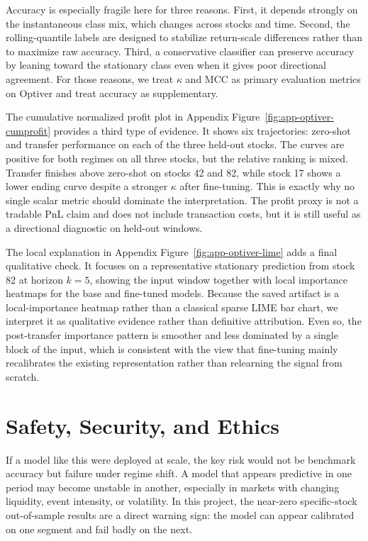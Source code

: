 \documentclass[11pt]{article}
\begin{document}
Accuracy is especially fragile here for three reasons. First, it depends strongly on the instantaneous class mix, which changes across stocks and time. Second, the rolling-quantile labels are designed to stabilize return-scale differences rather than to maximize raw accuracy. Third, a conservative classifier can preserve accuracy by leaning toward the stationary class even when it gives poor directional agreement. For those reasons, we treat $\kappa$ and MCC as primary evaluation metrics on Optiver and treat accuracy as supplementary.

The cumulative normalized profit plot in Appendix Figure~\ref{fig:app-optiver-cumprofit} provides a third type of evidence. It shows six trajectories: zero-shot and transfer performance on each of the three held-out stocks. The curves are positive for both regimes on all three stocks, but the relative ranking is mixed. Transfer finishes above zero-shot on stocks 42 and 82, while stock 17 shows a lower ending curve despite a stronger $\kappa$ after fine-tuning. This is exactly why no single scalar metric should dominate the interpretation. The profit proxy is not a tradable PnL claim and does not include transaction costs, but it is still useful as a directional diagnostic on held-out windows.

The local explanation in Appendix Figure~\ref{fig:app-optiver-lime} adds a final qualitative check. It focuses on a representative stationary prediction from stock 82 at horizon $k=5$, showing the input window together with local importance heatmaps for the base and fine-tuned models. Because the saved artifact is a local-importance heatmap rather than a classical sparse LIME bar chart, we interpret it as qualitative evidence rather than definitive attribution. Even so, the post-transfer importance pattern is smoother and less dominated by a single block of the input, which is consistent with the view that fine-tuning mainly recalibrates the existing representation rather than relearning the signal from scratch.

\section{Safety, Security, and Ethics}
If a model like this were deployed at scale, the key risk would not be benchmark accuracy but failure under regime shift. A model that appears predictive in one period may become unstable in another, especially in markets with changing liquidity, event intensity, or volatility. In this project, the near-zero specific-stock out-of-sample results are a direct warning sign: the model can appear calibrated on one segment and fail badly on the next.
\end{document}
